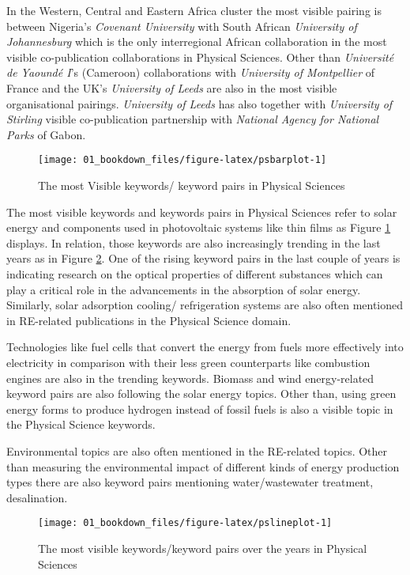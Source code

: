 \documentclass[12pt,twoside]{report}
\begin{document}
In the Western, Central and Eastern Africa cluster the most visible pairing is between Nigeria's \emph{Covenant University} with South African \emph{University of Johannesburg} which is the only interregional African collaboration in the most visible co-publication collaborations in Physical Sciences. Other than \emph{Université de Yaoundé I}'s (Cameroon) collaborations with \emph{University of Montpellier} of France and the UK's \emph{University of Leeds} are also in the most visible organisational pairings. \emph{University of Leeds} has also together with \emph{University of Stirling} visible co-publication partnership with \emph{National Agency for National Parks} of Gabon.

\begin{figure}
\texttt{[image: 01\_bookdown\_files/figure-latex/psbarplot-1]} \caption{The most Visible keywords/ keyword pairs in Physical Sciences}\label{fig:psbarplot}
\end{figure}

The most visible keywords and keywords pairs in Physical Sciences refer to solar energy and components used in photovoltaic systems like thin films as Figure \ref{fig:psbarplot} displays. In relation, those keywords are also increasingly trending in the last years as in Figure \ref{fig:pslineplot}. One of the rising keyword pairs in the last couple of years is indicating research on the optical properties of different substances which can play a critical role in the advancements in the absorption of solar energy. Similarly, solar adsorption cooling/ refrigeration systems are also often mentioned in RE-related publications in the Physical Science domain.

Technologies like fuel cells that convert the energy from fuels more effectively into electricity in comparison with their less green counterparts like combustion engines are also in the trending keywords. Biomass and wind energy-related keyword pairs are also following the solar energy topics. Other than, using green energy forms to produce hydrogen instead of fossil fuels is also a visible topic in the Physical Science keywords.

Environmental topics are also often mentioned in the RE-related topics. Other than measuring the environmental impact of different kinds of energy production types there are also keyword pairs mentioning water/wastewater treatment, desalination.

\begin{figure}
\texttt{[image: 01\_bookdown\_files/figure-latex/pslineplot-1]} \caption{The most visible keywords/keyword pairs over the years in Physical Sciences}\label{fig:pslineplot}
\end{figure}
\end{document}
